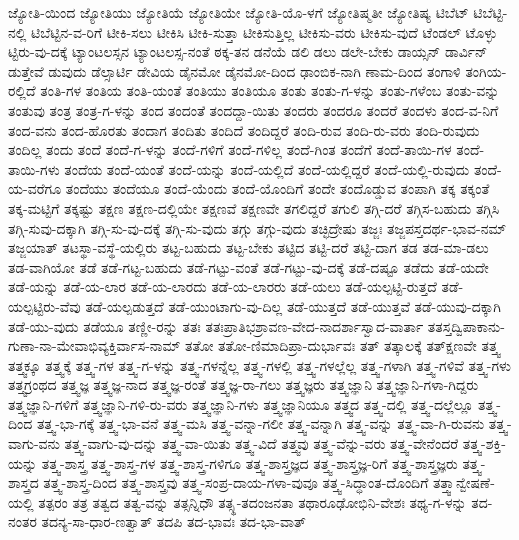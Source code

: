 {ಜ್ಯೋತಿ-ಯಿಂದ
ಜ್ಯೋತಿಯು
ಜ್ಯೋತಿಯೆ
ಜ್ಯೋತಿಯೇ
ಜ್ಯೋತಿ-ಯೊ-ಳಗೆ
ಜ್ಯೋತಿಷ್ಮತೀ
ಜ್ಯೋತಿಷ್ಯ
ಟಿಬೆಟ್
ಟಿಬೆಟ್ಟಿ-ನಲ್ಲಿ
ಟಿಬೆಟ್ಟಿನ-ವ-ರಿಗೆ
ಟೀಕಿ-ಸಲು
ಟೀಕಿಸಿ
ಟೀಕಿ-ಸುತ್ತಾ
ಟೀಕಿಸುತ್ತಿಲ್ಲ
ಟೀಕಿಸು-ವರು
ಟೀಕಿಸು-ವುದೆ
ಟೆಂಡಲ್
ಟೊಳ್ಳು
ಟ್ಟಿರು-ವು-ದಕ್ಕೆ
ಟ್ಯಾಂಟಲಸ್ಸನ
ಟ್ಯಾಂಟಲಸ್ಸ-ನಂತೆ
ಠಕ್ಕ-ತನ
ಡನೆಯೆ
ಡಲಿ
ಡಲು
ಡಲೇ-ಬೇಕು
ಡಾಯ್ಸನ್
ಡಾರ್ವಿನ್
ಡುತ್ತೇವೆ
ಡುವುದು
ಡೆಲ್ಸಾರ್ಟಿ
ಡೇವಿಯ
ಡೈನಮೋ
ಡೈನಮೋ-ದಿಂದ
ಢಾಂಬಿಕ-ನಾಗಿ
ಣಾಮ-ದಿಂದ
ತಂಗಾಳಿ
ತಂಗಿಯ-ರಲ್ಲಿದೆ
ತಂತಿ-ಗಳ
ತಂತಿಯ
ತಂತಿ-ಯಂತೆ
ತಂತಿಯು
ತಂತಿಯೂ
ತಂತು
ತಂತು-ಗ-ಳನ್ನು
ತಂತು-ಗಳೆಂಬ
ತಂತು-ವನ್ನು
ತಂತುವು
ತಂತ್ರ
ತಂತ್ರ-ಗ-ಳನ್ನು
ತಂದ
ತಂದಂತೆ
ತಂದದ್ದಾ-ಯಿತು
ತಂದರು
ತಂದರೂ
ತಂದರೆ
ತಂದಳು
ತಂದ-ವ-ನಿಗೆ
ತಂದ-ವನು
ತಂದ-ಹೊರತು
ತಂದಾಗ
ತಂದಿತು
ತಂದಿದೆ
ತಂದಿದ್ದರೆ
ತಂದಿ-ರುವ
ತಂದಿ-ರು-ವರು
ತಂದಿ-ರುವುದು
ತಂದಿಲ್ಲ
ತಂದು
ತಂದೆ
ತಂದೆ-ಗ-ಳನ್ನು
ತಂದೆ-ಗಳಿಗೆ
ತಂದೆ-ಗಳಿಲ್ಲ
ತಂದೆ-ಗಿಂತ
ತಂದೆಗೆ
ತಂದೆ-ತಾಯಿ-ಗಳ
ತಂದೆ-ತಾಯಿ-ಗಳು
ತಂದೆಯ
ತಂದೆ-ಯಂತೆ
ತಂದೆ-ಯನ್ನು
ತಂದೆ-ಯಲ್ಲಿದೆ
ತಂದೆ-ಯಲ್ಲಿದ್ದರೆ
ತಂದೆ-ಯಲ್ಲಿ-ರುವುದು
ತಂದೆ-ಯ-ವರೆಗೂ
ತಂದೆಯು
ತಂದೆಯೂ
ತಂದೆ-ಯೆಂದು
ತಂದೆ-ಯೊಂದಿಗೆ
ತಂದೇ
ತಂದೊಡ್ಡುವ
ತಂಪಾಗಿ
ತಕ್ಕ
ತಕ್ಕಂತೆ
ತಕ್ಕ-ಮಟ್ಟಿಗೆ
ತಕ್ಕಷ್ಟು
ತಕ್ಷಣ
ತಕ್ಷಣ-ದಲ್ಲಿಯೇ
ತಕ್ಷಣವೆ
ತಕ್ಷಣವೇ
ತಗಲಿದ್ದರೆ
ತಗುಲಿ
ತಗ್ಗಿ-ದರೆ
ತಗ್ಗಿಸ-ಬಹುದು
ತಗ್ಗಿಸಿ
ತಗ್ಗಿ-ಸುವು-ದಕ್ಕಾಗಿ
ತಗ್ಗಿ-ಸು-ವು-ದಕ್ಕೆ
ತಗ್ಗಿ-ಸು-ವುದು
ತಗ್ಗು
ತಗ್ಗು-ವುದು
ತಚ್ಛಿದ್ರೇಷು
ತಜ್ಜಃ
ತಜ್ಜಪಸ್ತದರ್ಥ-ಭಾವ-ನಮ್
ತಜ್ಜಯಾತ್
ತಟಸ್ಥಾ-ವಸ್ಥೆ-ಯಲ್ಲಿರು
ತಟ್ಟ-ಬಹುದು
ತಟ್ಟ-ಬೇಕು
ತಟ್ಟಿದ
ತಟ್ಟಿ-ದರೆ
ತಟ್ಟಿ-ದಾಗ
ತಡ
ತಡ-ಮಾ-ಡಲು
ತಡ-ವಾಗಿಯೋ
ತಡೆ
ತಡೆ-ಗಟ್ಟ-ಬಹುದು
ತಡೆ-ಗಟ್ಟು-ವಂತೆ
ತಡೆ-ಗಟ್ಟು-ವು-ದಕ್ಕೆ
ತಡೆ-ದಷ್ಟೂ
ತಡೆದು
ತಡೆ-ಯದೇ
ತಡೆ-ಯನ್ನು
ತಡೆ-ಯ-ಲಾರ
ತಡೆ-ಯ-ಲಾರದು
ತಡೆ-ಯ-ಲಾರರು
ತಡೆ-ಯಲು
ತಡೆ-ಯಲ್ಪಟ್ಟಿ-ರುತ್ತದೆ
ತಡೆ-ಯಲ್ಪಟ್ಟಿರು-ವೆವು
ತಡೆ-ಯಲ್ಪಡುತ್ತದೆ
ತಡೆ-ಯುಂಟಾಗು-ವು-ದಿಲ್ಲ
ತಡೆ-ಯುತ್ತದೆ
ತಡೆ-ಯುತ್ತವೆ
ತಡೆ-ಯುವು-ದಕ್ಕಾಗಿ
ತಡೆ-ಯು-ವುದು
ತಡೆಯೂ
ತಣ್ಣೀ-ರನ್ನು
ತತಃ
ತತಃಪ್ರಾತಿಭಶ್ರಾವಣ-ವೇದ-ನಾದರ್ಶಾಸ್ವಾದ-ವಾರ್ತಾ
ತತಸ್ತದ್ವಿಪಾಕಾನು-ಗುಣಾ-ನಾ-ಮೇವಾಭಿವ್ಯಕ್ತಿರ್ವಾಸ-ನಾಮ್
ತತೋ
ತತೋ-ಣಿಮಾದಿಪ್ರಾ-ದುರ್ಭಾವಃ
ತತ್
ತತ್ಕಾಲಕ್ಕೆ
ತತ್ಕ್ಷಣವೇ
ತತ್ತ್ವ
ತತ್ತ್ವಕ್ಕೂ
ತತ್ತ್ವಕ್ಕೆ
ತತ್ತ್ವ-ಗಳ
ತತ್ತ್ವ-ಗ-ಳನ್ನು
ತತ್ತ್ವ-ಗಳನ್ನೆಲ್ಲ
ತತ್ತ್ವ-ಗಳಲ್ಲಿ
ತತ್ತ್ವ-ಗಳಲ್ಲೆಲ್ಲ
ತತ್ತ್ವ-ಗಳಾಗಿ
ತತ್ತ್ವ-ಗಳಿವೆ
ತತ್ತ್ವ-ಗಳು
ತತ್ತ್ವಗ್ರಂಥದ
ತತ್ತ್ವಜ್ಞ
ತತ್ತ್ವಜ್ಞ-ನಾದ
ತತ್ತ್ವಜ್ಞ-ರಂತೆ
ತತ್ತ್ವಜ್ಞ-ರಾ-ಗಲು
ತತ್ತ್ವಜ್ಞರು
ತತ್ತ್ವಜ್ಞಾನಿ
ತತ್ತ್ವಜ್ಞಾನಿ-ಗಳಾ-ಗಿದ್ದರು
ತತ್ತ್ವಜ್ಞಾನಿ-ಗಳಿಗೆ
ತತ್ತ್ವಜ್ಞಾನಿ-ಗಳಿ-ರು-ವರು
ತತ್ತ್ವಜ್ಞಾನಿ-ಗಳು
ತತ್ತ್ವಜ್ಞಾನಿಯೂ
ತತ್ತ್ವದ
ತತ್ತ್ವ-ದಲ್ಲಿ
ತತ್ತ್ವ-ದಲ್ಲೆಲ್ಲೂ
ತತ್ತ್ವ-ದಿಂದ
ತತ್ತ್ವ-ಭಾ-ಗಕ್ಕೆ
ತತ್ತ್ವ-ಭಾ-ವನೆ
ತತ್ತ್ವ-ಮಸಿ
ತತ್ತ್ವ-ವನ್ನಾ-ಗಲೀ
ತತ್ತ್ವ-ವನ್ನಾಗಿ
ತತ್ತ್ವ-ವನ್ನು
ತತ್ತ್ವ-ವಾ-ಗಿ-ರುವನು
ತತ್ತ್ವ-ವಾಗು-ವನು
ತತ್ತ್ವ-ವಾಗು-ವು-ದನ್ನು
ತತ್ತ್ವ-ವಾ-ಯಿತು
ತತ್ತ್ವ-ವಿದೆ
ತತ್ತ್ವವು
ತತ್ತ್ವ-ವೆನ್ನು-ವರು
ತತ್ತ್ವ-ವೇನೆಂದರೆ
ತತ್ತ್ವ-ಶಕ್ತಿ-ಯನ್ನು
ತತ್ತ್ವ-ಶಾಸ್ತ್ರ
ತತ್ತ್ವ-ಶಾಸ್ತ್ರ-ಗಳ
ತತ್ತ್ವ-ಶಾಸ್ತ್ರ-ಗಳಿಗೂ
ತತ್ತ್ವ-ಶಾಸ್ತ್ರಜ್ಞದ
ತತ್ತ್ವ-ಶಾಸ್ತ್ರಜ್ಞ-ರಿಗೆ
ತತ್ತ್ವ-ಶಾಸ್ತ್ರಜ್ಞರು
ತತ್ತ್ವ-ಶಾಸ್ತ್ರದ
ತತ್ತ್ವ-ಶಾಸ್ತ್ರ-ದಿಂದ
ತತ್ತ್ವ-ಶಾಸ್ತ್ರವು
ತತ್ತ್ವ-ಸಂಪ್ರ-ದಾಯ-ಗಳಾ-ವುವೂ
ತತ್ತ್ವ-ಸಿದ್ಧಾಂತ-ದೊಂದಿಗೆ
ತತ್ತ್ವಾನ್ವೇಷಣೆ-ಯಲ್ಲಿ
ತತ್ಪರಂ
ತತ್ರ
ತತ್ವದ
ತತ್ವ-ವನ್ನು
ತತ್ಸನ್ನಿಧೌ
ತತ್ಸ್ಥ-ತದಂಜನತಾ
ತಥಾರೂಢೋಭಿನಿ-ವೇಶಃ
ತಥ್ಯ-ಗ-ಳನ್ನು
ತದ-ನಂತರ
ತದನ್ಯ-ಸಾ-ಧಾರ-ಣತ್ವಾತ್
ತದಪಿ
ತದ-ಭಾವಃ
ತದ-ಭಾ-ವಾತ್
}
